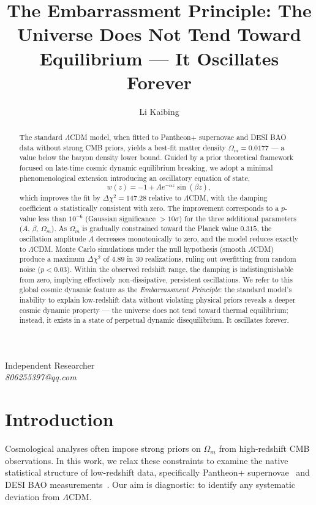 \documentclass[10pt,a4paper]{article}
\title{The Embarrassment Principle: The Universe Does Not Tend Toward Equilibrium — It Oscillates Forever}
\author{Li Kaibing}
\date{}
\begin{document}
\maketitle
\begin{center}
Independent Researcher \\
\textit{806255397@qq.com}
\end{center}

\begin{abstract}
The standard $\Lambda$CDM model, when fitted to Pantheon+ supernovae and DESI BAO data without strong CMB priors, yields a best-fit matter density $\Omega_m = 0.0177$ — a value below the baryon density lower bound. Guided by a prior theoretical framework focused on late-time cosmic dynamic equilibrium breaking, we adopt a minimal phenomenological extension introducing an oscillatory equation of state,
\[
w(z) = -1 + A e^{-\alpha z}\sin(\beta z),
\]
which improves the fit by $\Delta\chi^2 = 147.28$ relative to $\Lambda$CDM, with the damping coefficient $\alpha$ statistically consistent with zero. The improvement corresponds to a $p$-value less than $10^{-6}$ (Gaussian significance $>10\sigma$) for the three additional parameters ($A$, $\beta$, $\Omega_m$). As $\Omega_m$ is gradually constrained toward the Planck value $0.315$, the oscillation amplitude $A$ decreases monotonically to zero, and the model reduces exactly to $\Lambda$CDM. Monte Carlo simulations under the null hypothesis (smooth $\Lambda$CDM) produce a maximum $\Delta\chi^2$ of $4.89$ in 30 realizations, ruling out overfitting from random noise ($p<0.03$). Within the observed redshift range, the damping is indistinguishable from zero, implying effectively non‑dissipative, persistent oscillations. We refer to this global cosmic dynamic feature as the \emph{Embarrassment Principle}: the standard model's inability to explain low-redshift data without violating physical priors reveals a deeper cosmic dynamic property — the universe does not tend toward thermal equilibrium; instead, it exists in a state of perpetual dynamic disequilibrium. It oscillates forever.
\end{abstract}

\section{Introduction}
Cosmological analyses often impose strong priors on $\Omega_m$ from high-redshift CMB observations. In this work, we relax these constraints to examine the native statistical structure of low-redshift data, specifically Pantheon+ supernovae~\cite{Scolnic2022} and DESI BAO measurements~\cite{DESI2024}. Our aim is diagnostic: to identify any systematic deviation from $\Lambda$CDM.
\end{document}
